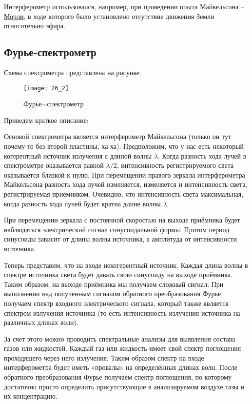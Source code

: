 Интерферометр использовался, например, при проведении  \href{https://elementy.ru/trefil/21167/Opyt_MaykelsonaMorli}{опыта Майкельсона -- Морли}, в ходе которого было установлено отсутствие движения Земли относительно эфира.

\subsection{Фурье-спектрометр}

Схема спектрометра представлена на рисунке. 

\begin{figure}[H]
	\centering
	\texttt{[image: 26\_2]}
	\caption{Фурье=спектрометр}
\end{figure}

Приведем краткое описание:

Основой спектрометра является интерферометр Майкельсона (только он тут почему-то без второй пластины, ха-ха). Предположим, что у нас есть некоторый когерентный источник излучения с длиной волны $\lambda$. Когда разность хода лучей в спектрометре оказывается равной $\lambda/2$, интенсивность регистрируемого света оказывается близкой к нулю. При перемещении правого зеркала интерферометра Майкельсона разность хода лучей изменяется, изменяется и интенсивность света, регистрируемая приёмником. Очевидно, что интенсивность света максимальная, когда разность хода лучей будет кратна длине волны $\lambda$.

При перемещении зеркала с постоянной скоростью на выходе приёмника будет наблюдаться электрический сигнал синусоидальной формы. Притом период синусоиды зависит от длины волны источника, а амплитуда от интенсивности источника.

Теперь представим, что на входе некогерентный источник. Каждая длина волны в спектре источника света будет давать свою синусоиду на выходе приёмника. Таким образом, на выходе приёмника мы получаем сложный сигнал. При выполнении над полученным сигналом обратного преобразования Фурье получаем спектр входного электрического сигнала, который также является спектром излучения источника (то есть интенсивность излучения источника на различных длинах волн).

За счет этого можно проводить спектральные анализы для выявления состава газов или жидкостей. Каждый газ или жидкость имеет свой спектр поглощения проходящего через него излучения. Таким образом спектр на входе интерферометра будет иметь «провалы» на определённых длинах волн. После обратного преобразования Фурье получаем спектр поглощения, по которому достаточно просто определить присутствующие в анализируемом воздухе газы и их концентрацию.

